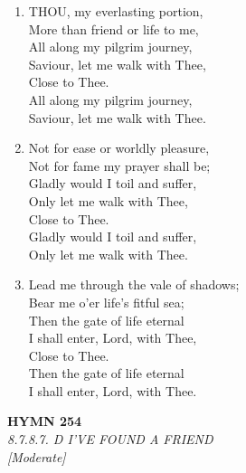 \begin{enumerate}
    \item THOU, my everlasting portion, \\
            More than friend or life to me, \\
        All along my pilgrim journey, \\
            Saviour, let me walk with Thee, \\
                Close to Thee. \\
            All along my pilgrim journey, \\
            Saviour, let me walk with Thee.

    \item Not for ease or worldly pleasure, \\
            Not for fame my prayer shall be; \\
        Gladly would I toil and suffer, \\
            Only let me walk with Thee, \\
                Close to Thee. \\
            Gladly would I toil and suffer, \\
            Only let me walk with Thee.

    \item Lead me through the vale of shadows; \\
            Bear me o'er life's fitful sea; \\
        Then the gate of life eternal \\
            I shall enter, Lord, with Thee, \\
                Close to Thee. \\
            Then the gate of life eternal \\
            I shall enter, Lord, with Thee.

\end{enumerate}

\newpage
\begin{center}
    {\Large \textbf{HYMN 254}}
    \\
    \textit{8.7.8.7. D I'VE FOUND A FRIEND}
    \\
    \textit{\small [Moderate]}
\end{center}
\vspace{1em}

